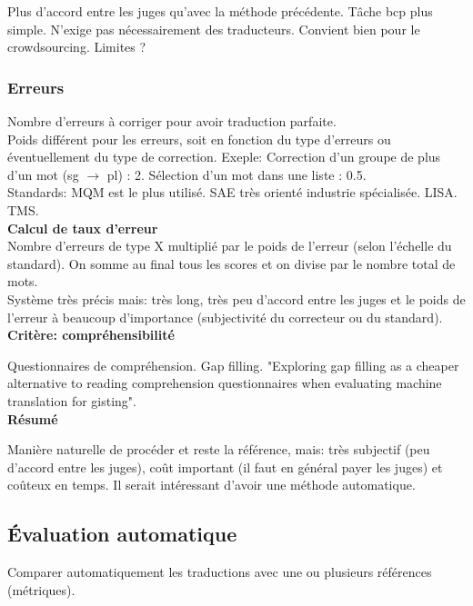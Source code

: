 Plus d’accord entre les juges qu’avec la méthode précédente. Tâche bcp plus simple. N’exige pas nécessairement des traducteurs. Convient bien pour le crowdsourcing. Limites ?

\subsubsection{Erreurs}

Nombre d’erreurs à corriger pour avoir traduction parfaite.\\

Poids différent pour les erreurs, soit en fonction du type d’erreurs ou éventuellement du type de correction.
Exeple: Correction d’un groupe de plus d’un mot (sg $\rightarrow$ pl) : 2. Sélection d’un mot dans une liste : 0.5. \\

Standards: MQM est le plus utilisé. SAE très orienté industrie spécialisée. LISA. TMS. \\

\textbf{Calcul de taux d'erreur} \\

Nombre d'erreurs de type X multiplié par le poids de l'erreur (selon l'échelle du standard). On somme au final tous les scores et on divise par le nombre total de mots. \\

Système très précis mais: très long, très peu d'accord entre les juges et le poids de l'erreur à beaucoup d'importance (subjectivité du correcteur ou du standard).\\


\textbf{Critère: compréhensibilité}

Questionnaires de compréhension. Gap filling. "Exploring gap filling as a cheaper alternative to reading comprehension questionnaires when evaluating machine translation for gisting".\\

\textbf{Résumé}

Manière naturelle de procéder et reste la référence, mais: très subjectif (peu d'accord entre les juges), coût important (il faut en général payer les juges) et coûteux en temps. Il serait intéressant d'avoir une méthode automatique.

\subsection{Évaluation automatique}

Comparer automatiquement les traductions avec une ou plusieurs références (métriques).

